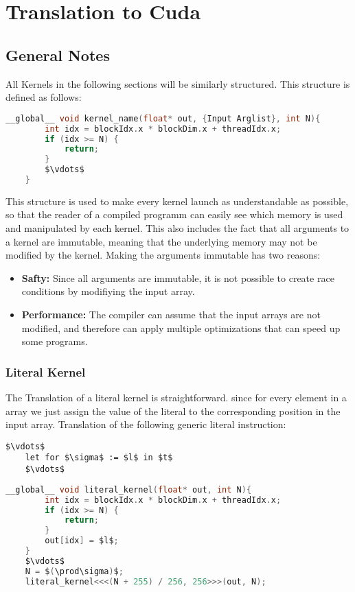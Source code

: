 \chapter{Translation to Cuda}
\section{General Notes}
All Kernels in the following sections will be similarly structured.
This structure is defined as follows:
\begin{lstlisting}[language=c, caption={Kernel Structure}, label={lst:kernel-structure}, mathescape=true]
    __global__ void kernel_name(float* out, {Input Arglist}, int N){
        int idx = blockIdx.x * blockDim.x + threadIdx.x;
        if (idx >= N) {
            return;
        }
        $\vdots$
    }
\end{lstlisting}
This structure is used to make every kernel launch as understandable as possible,
so that the reader of a compiled programm can easily see which memory is used
and manipulated by each kernel.
This also includes the fact that all arguments to a kernel are immutable, meaning
that the underlying memory may not be modified by the kernel.
Making the arguments immutable has two reasons:
\begin{itemize}
    \item \textbf{Safty:} Since all arguments are immutable, it is not possible to
          create race conditions by modifiying the input array.
    \item \textbf{Performance:} The compiler can assume that the input arrays are not modified, and therefore can apply multiple optimizations that can speed
          up some programs.
\end{itemize}


\subsection{Literal Kernel}
The Translation of a literal kernel is straightforward. since for every element in a array we just assign  the value of the literal to the
corresponding position in the input array.
Translation of the following generic literal instruction:
\begin{lstlisting}[mathescape=true]
    $\vdots$
    let for $\sigma$ := $l$ in $t$
    $\vdots$
\end{lstlisting}
\begin{lstlisting}[language=c, caption={Literal Kernel Translation}, label={lst:literal-kernel}, mathescape=true]
    __global__ void literal_kernel(float* out, int N){
        int idx = blockIdx.x * blockDim.x + threadIdx.x;
        if (idx >= N) {
            return;
        }
        out[idx] = $l$;
    } 
    $\vdots$
    N = $(\prod\sigma)$;
    literal_kernel<<<(N + 255) / 256, 256>>>(out, N);
\end{lstlisting}



